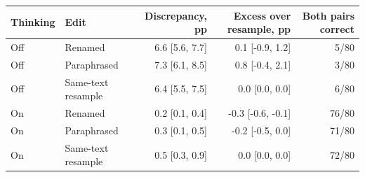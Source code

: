 \begin{tabular}{llrrr}
\toprule
Thinking & Edit & Discrepancy, pp & Excess over resample, pp & Both pairs correct \\
\midrule
Off & Renamed & 6.6 [5.6, 7.7] & 0.1 [-0.9, 1.2] & 5/80 \\
Off & Paraphrased & 7.3 [6.1, 8.5] & 0.8 [-0.4, 2.1] & 3/80 \\
Off & Same-text resample & 6.4 [5.5, 7.5] & 0.0 [0.0, 0.0] & 6/80 \\
On & Renamed & 0.2 [0.1, 0.4] & -0.3 [-0.6, -0.1] & 76/80 \\
On & Paraphrased & 0.3 [0.1, 0.5] & -0.2 [-0.5, 0.0] & 71/80 \\
On & Same-text resample & 0.5 [0.3, 0.9] & 0.0 [0.0, 0.0] & 72/80 \\
\bottomrule
\end{tabular}
